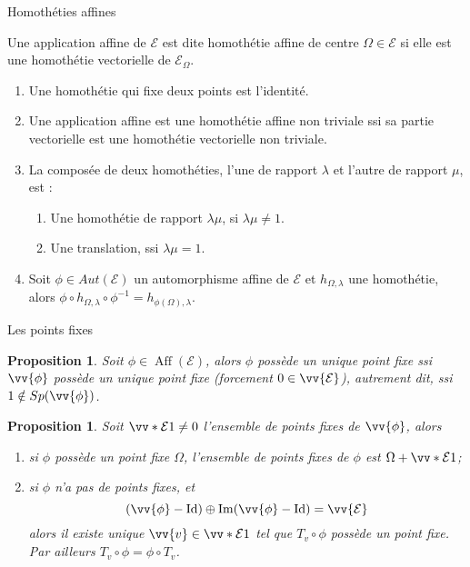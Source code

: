 \documentclass[aspectratio=1610 %
]{beamer}
\newtheorem{proposition}[theorem]{Proposition}
\DeclareMathOperator{\Aff}{Aff}
\let\ker\relax\DeclareMathOperator{\ker}{Ker}
\DeclareMathOperator{\im}{Im}
\newcommand{\id}{\mathrm{Id}}
\begin{document}
  \begin{frame}{Homothéties affines}
    \begin{definition}
      Une application affine de $\mathcal{E}$ est dite \alert{homothétie affine de centre $\Omega$}$\in\mathcal{E}$ si elle est une homothétie vectorielle de $\mathcal{E}_{\Omega}$.
    \end{definition}
    \begin{enumerate}[<+(1)->]
      \item Une homothétie qui fixe deux points est l'identité.
      \item Une application affine est une homothétie affine non triviale ssi sa partie vectorielle est une homothétie vectorielle non triviale.
      \item La composée de deux homothéties, l'une de rapport $\lambda$ et l'autre de rapport $\mu$, est :
      \begin{enumerate}[<+(1)->]
        \item Une homothétie de rapport $\lambda\mu$, si $\lambda\mu \neq 1$.
        \item Une translation, ssi $\lambda\mu=1$.
      \end{enumerate}
      \item Soit $\phi \in Aut(\mathcal{E})$ un automorphisme affine de $\mathcal{E}$ et $h_{\Omega,\lambda}$ une homothétie, alors $\phi\circ h_{\Omega,\lambda}\circ\phi^{-1}=h_{\phi(\Omega),\lambda}$.
    \end{enumerate}
  \end{frame}
  \begin{frame}{Les points fixes}
    \begin{proposition}
      Soit $\phi\in\Aff(\mathcal{E})$, alors $\phi$ possède un unique point fixe ssi $\vv{\phi}$ possède un unique point fixe (forcement $0\in\vv{\mathcal{E}}$)\pause, autrement dit, ssi $1 \notin Sp(\vv{\phi})$.
    \end{proposition}\pause
    \begin{proposition}
      Soit $\vv*{\mathcal{E}}{1} \neq 0$ l'ensemble de points fixes de $\vv{\phi}$, alors
      \begin{enumerate}[<+(1)->]
        \item si $\phi$ possède un point fixe $\Omega$, l'ensemble de points fixes de $\phi$ est $\Omega+\vv*{\mathcal{E}}{1}$;
        \item si $\phi$ n'a pas de points fixes\pause, et
          $$
            \ker(\vv{\phi}-\id) \oplus \im(\vv{\phi}-\id) = \vv{\mathcal{E}}
          $$\pause
        alors il existe unique $\vv{v}\in\vv*{\mathcal{E}}{1}$ tel que $T_{v}\circ\phi$ possède un point fixe.\newline\pause
        Par ailleurs $T_{v}\circ\phi=\phi\circ T_{v}$.
      \end{enumerate}
    \end{proposition}
  \end{frame}
\end{document}
